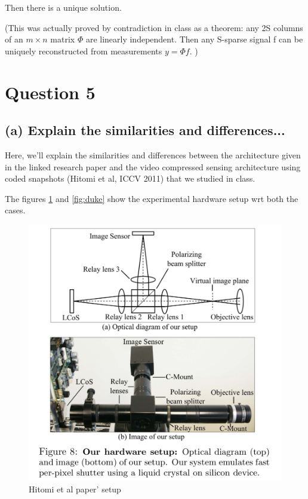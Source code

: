 \documentclass[fleqn, 11pt]{article}
\begin{document}
Then there is a unique solution. 

(This was actually proved by contradiction in class as a theorem: any 2S columns of an $m \times n$ matrix $\Phi$ are linearly independent. Then
any S-sparse signal f can be uniquely
reconstructed from measurements $y= \Phi f$. )


\newpage
\section*{Question 5}
\setcounter{equation}{0}

\subsection*{(a) Explain the similarities and differences... }

Here, we'll explain the similarities and differences between the architecture given in the 
linked research paper and the video compressed sensing
architecture using coded snapshots (Hitomi et al, ICCV 2011) that we studied in class.


The figures \ref{fig:hitomi} and \ref{fig:duke}  show the experimental hardware setup wrt 
both the cases.

        
\begin{figure}[h!]
        \includegraphics[scale=0.3]{hitomi.png}
        \caption{Hitomi et al paper' setup}
        \label{fig:hitomi}
\end{figure}
\end{document}
